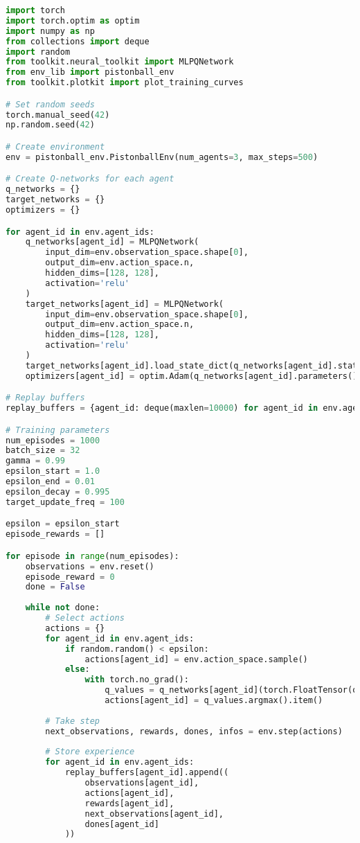 \begin{lstlisting}[language=python, caption=Multi-Agent DQN Training]
import torch
import torch.optim as optim
import numpy as np
from collections import deque
import random
from toolkit.neural_toolkit import MLPQNetwork
from env_lib import pistonball_env
from toolkit.plotkit import plot_training_curves

# Set random seeds
torch.manual_seed(42)
np.random.seed(42)

# Create environment
env = pistonball_env.PistonballEnv(num_agents=3, max_steps=500)

# Create Q-networks for each agent
q_networks = {}
target_networks = {}
optimizers = {}

for agent_id in env.agent_ids:
    q_networks[agent_id] = MLPQNetwork(
        input_dim=env.observation_space.shape[0],
        output_dim=env.action_space.n,
        hidden_dims=[128, 128],
        activation='relu'
    )
    target_networks[agent_id] = MLPQNetwork(
        input_dim=env.observation_space.shape[0],
        output_dim=env.action_space.n,
        hidden_dims=[128, 128],
        activation='relu'
    )
    target_networks[agent_id].load_state_dict(q_networks[agent_id].state_dict())
    optimizers[agent_id] = optim.Adam(q_networks[agent_id].parameters(), lr=0.001)

# Replay buffers
replay_buffers = {agent_id: deque(maxlen=10000) for agent_id in env.agent_ids}

# Training parameters
num_episodes = 1000
batch_size = 32
gamma = 0.99
epsilon_start = 1.0
epsilon_end = 0.01
epsilon_decay = 0.995
target_update_freq = 100

epsilon = epsilon_start
episode_rewards = []

for episode in range(num_episodes):
    observations = env.reset()
    episode_reward = 0
    done = False
    
    while not done:
        # Select actions
        actions = {}
        for agent_id in env.agent_ids:
            if random.random() < epsilon:
                actions[agent_id] = env.action_space.sample()
            else:
                with torch.no_grad():
                    q_values = q_networks[agent_id](torch.FloatTensor(observations[agent_id]))
                    actions[agent_id] = q_values.argmax().item()
        
        # Take step
        next_observations, rewards, dones, infos = env.step(actions)
        
        # Store experience
        for agent_id in env.agent_ids:
            replay_buffers[agent_id].append((
                observations[agent_id],
                actions[agent_id],
                rewards[agent_id],
                next_observations[agent_id],
                dones[agent_id]
            ))
        

\end{lstlisting}
